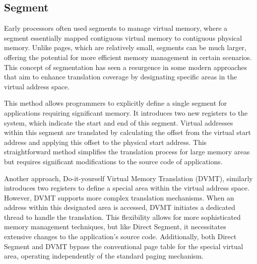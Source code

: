 \subsection{Segment}
Early processors often used segments\cite{basu_efficient_nodate} to manage virtual memory, where a segment essentially mapped contiguous 
virtual memory to contiguous physical memory. Unlike pages, which are relatively small, segments can be much 
larger, offering the potential for more efficient memory management in certain scenarios. 
This concept of segmentation has seen a resurgence in some modern approaches that aim to enhance 
translation coverage by designating specific areas in the virtual address space.
\newline

This method allows programmers to explicitly define 
a single segment for applications requiring significant memory. It introduces two new 
registers to the system, which indicate the start and end of this segment. 
Virtual addresses within this segment are translated by calculating 
the offset from the virtual start address and applying this offset to the 
physical start address. This straightforward method simplifies the translation 
process for large memory areas but requires significant modifications to the 
source code of applications.
\newline

Another approach, Do-it-yourself Virtual Memory Translation (DVMT)\cite{noauthor_-it-yourself_nodate}, similarly 
introduces two registers to define a special area within the virtual address space. 
However, DVMT supports more complex translation mechanisms. When an address 
within this designated area is accessed, DVMT initiates a dedicated 
thread to handle the translation. This flexibility allows for more 
sophisticated memory management techniques, but like Direct Segment, 
it necessitates extensive changes to the application's source code. 
Additionally, both Direct Segment and DVMT bypass the conventional page table 
for the special virtual area, operating independently of the standard 
paging mechanism.
\newline

